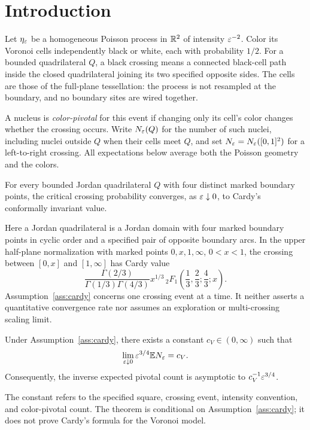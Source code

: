 \section{Introduction}\label{sec:introduction}

Let $\eta_\varepsilon$ be a homogeneous Poisson process in $\mathbb R^2$ of intensity
$\varepsilon^{-2}$. Color its Voronoi cells independently black or white, each
with probability $1/2$. For a bounded quadrilateral $Q$, a black crossing
means a connected black-cell path inside the closed quadrilateral joining
its two specified opposite sides. The cells are those of the full-plane
tessellation: the process is not resampled at the boundary, and no
boundary sites are wired together.

A nucleus is \emph{color-pivotal} for this event if changing only its cell's
color changes whether the crossing occurs. Write $N_\varepsilon(Q)$ for the
number of such nuclei, including nuclei outside $Q$ when their cells
meet $Q$, and set $N_\varepsilon=N_\varepsilon([0,1]^2)$ for a left-to-right crossing.
All expectations below average both the Poisson geometry and the colors.

\begin{assumption}\label{ass:cardy}
For every bounded Jordan quadrilateral $Q$ with four distinct marked
boundary points, the critical crossing probability converges, as
$\varepsilon\downarrow0$, to Cardy's conformally invariant value.
\end{assumption}

Here a Jordan quadrilateral is a Jordan domain with four marked boundary
points in cyclic order and a specified pair of opposite boundary arcs.
In the upper half-plane normalization with marked points $0,x,1,\infty$,
$0<x<1$, the crossing between $[0,x]$ and $[1,\infty]$ has Cardy value
\[
 \frac{\Gamma(2/3)}{\Gamma(1/3)\Gamma(4/3)}
 x^{1/3}\,{}_2F_1\!\left(\frac13,\frac23;\frac43;x\right).
\]
Assumption~\ref{ass:cardy} concerns one crossing event at a time. It
neither asserts a quantitative convergence rate nor assumes an
exploration or multi-crossing scaling limit.

\begin{theorem}\label{thm:main}
Under Assumption~\ref{ass:cardy}, there exists a constant
$c_V\in(0,\infty)$ such that
\[
 \lim_{\varepsilon\downarrow0}\varepsilon^{3/4}\mathbb E N_\varepsilon=c_V.
\]
Consequently, the inverse expected pivotal count is asymptotic to
$c_V^{-1}\varepsilon^{3/4}$.
\end{theorem}

The constant refers to the specified square, crossing event, intensity
convention, and color-pivotal count. The theorem is conditional on
Assumption~\ref{ass:cardy}; it does not prove Cardy's formula for the
Voronoi model.

